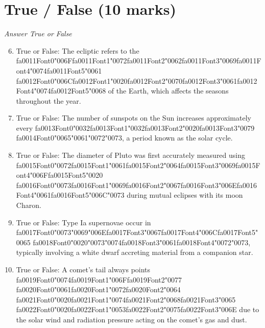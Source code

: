 \documentclass[12pt]{article}
\begin{document}
\section*{True / False (10 marks)}
\textit{Answer True or False}
\begin{enumerate}[label=\arabic*.]
\setcounter{enumi}{5}
\item True or False: The ecliptic refers to the {\csname fa0011Font0\endcsname\char"006F}{\csname fa0011Font1\endcsname\char"0072}{\csname fa0011Font2\endcsname\char"0062}{\csname fa0011Font3\endcsname\char"0069}{\csname fa0011Font4\endcsname\char"0074}{\csname fa0011Font5\endcsname\char"0061} {\csname fa0012Font0\endcsname\char"006C}{\csname fa0012Font1\endcsname\char"0020}{\csname fa0012Font2\endcsname\char"0070}{\csname fa0012Font3\endcsname\char"0061}{\csname fa0012Font4\endcsname\char"0074}{\csname fa0012Font5\endcsname\char"0068} of the Earth, which affects the seasons throughout the year.
\item True or False: The number of sunspots on the Sun increases approximately every {\csname fa0013Font0\endcsname\char"0032}{\csname fa0013Font1\endcsname\char"0032}{\csname fa0013Font2\endcsname\char"0020}{\csname fa0013Font3\endcsname\char"0079} {\csname fa0014Font0\endcsname\char"0065}{\char"0061}{\char"0072}{\char"0073}, a period known as the solar cycle.
\item True or False: The diameter of Pluto was first accurately measured using {\csname fa0015Font0\endcsname\char"0072}{\csname fa0015Font1\endcsname\char"0061}{\csname fa0015Font2\endcsname\char"0064}{\csname fa0015Font3\endcsname\char"0069}{\csname fa0015Font4\endcsname\char"006F}{\csname fa0015Font5\endcsname\char"0020} {\csname fa0016Font0\endcsname\char"0073}{\csname fa0016Font1\endcsname\char"0069}{\csname fa0016Font2\endcsname\char"0067}{\csname fa0016Font3\endcsname\char"006E}{\csname fa0016Font4\endcsname\char"0061}{\csname fa0016Font5\endcsname\char"006C}{\char"0073} during mutual eclipses with its moon Charon.
\item True or False: Type Ia supernovae occur in {\csname fa0017Font0\endcsname\char"0073}{\char"0069}{\char"006E}{\csname fa0017Font3\endcsname\char"0067}{\csname fa0017Font4\endcsname\char"006C}{\csname fa0017Font5\endcsname\char"0065} {\csname fa0018Font0\endcsname\char"0020}{\char"0073}{\char"0074}{\csname fa0018Font3\endcsname\char"0061}{\csname fa0018Font4\endcsname\char"0072}{\char"0073}, typically involving a white dwarf accreting material from a companion star.
\item True or False: A comet's tail always points {\csname fa0019Font0\endcsname\char"0074}{\csname fa0019Font1\endcsname\char"006F}{\csname fa0019Font2\endcsname\char"0077} {\csname fa0020Font0\endcsname\char"0061}{\csname fa0020Font1\endcsname\char"0072}{\csname fa0020Font2\endcsname\char"0064} {\csname fa0021Font0\endcsname\char"0020}{\csname fa0021Font1\endcsname\char"0074}{\csname fa0021Font2\endcsname\char"0068}{\csname fa0021Font3\endcsname\char"0065} {\csname fa0022Font0\endcsname\char"0020}{\csname fa0022Font1\endcsname\char"0053}{\csname fa0022Font2\endcsname\char"0075}{\csname fa0022Font3\endcsname\char"006E} due to the solar wind and radiation pressure acting on the comet's gas and dust.
\end{enumerate}
\end{document}

